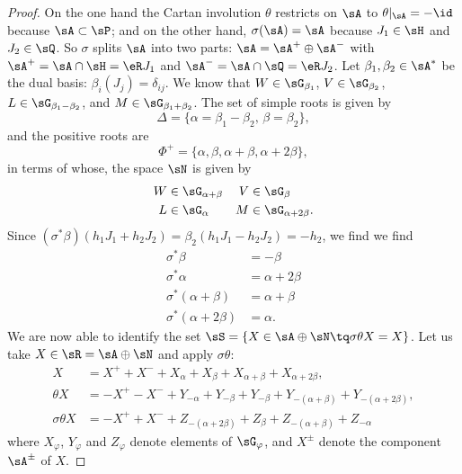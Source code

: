 \begin{proof}
On the one hand the Cartan involution $\theta$ restricts on $\sA$ to $\theta|_{\sA}=-\id$ because $\sA\subset\sP$; and on the other hand, $\sigma(\sA)=\sA$ because $J_1\in\sH$ and $J_2\in\sQ$. So $\sigma$ splits $\sA$ into two parts:  $\sA=\sA^{+}\oplus\sA^{-}$ with $\sA^+=\sA\cap\sH=\eR J_1$ and $\sA^-=\sA\cap\sQ=\eR J_2$. Let $\beta_{1},\beta_{2}\in\sA^*$ be the dual basis: $\beta_{i}(J_{j})=\delta_{ij}$.  We know that $W\in\sG_{\beta_{1}}$, $V\in\sG_{\beta_{2}}$, $L\in\sG_{\beta_{1}-\beta_{2}}$, and $M\in\sG_{\beta_{1}+\beta_{2}}$.  The set of simple roots is given by
\[
  \Delta=\{ \alpha=\beta_{1}-\beta_{2},\,\beta=\beta_{2} \},
\]
and the positive roots are
\[
 \Phi^{+}=\{ \alpha,\beta,\alpha+\beta,\alpha+2\beta \},
\]
in terms of whose, the space $\sN$ is given by
\begin{align*}
W&\in\sG_{\alpha+\beta}&V&\in\sG_{\beta}\\
L&\in\sG_{\alpha}&M&\in\sG_{\alpha+2\beta}.
\end{align*}
Since $(\sigma^*\beta)(h_1J_1+h_2J_2)=\beta_{2}(h_1J_1-h_2J_2)=-h_2$, we find
 we find
\begin{align*}
 \sigma^*\beta&=-\beta\\
\sigma^*\alpha&=\alpha+2\beta\\
\sigma^*(\alpha+\beta)&=\alpha+\beta\\
\sigma^*(\alpha+2\beta)&=\alpha.
\end{align*}
We are now able to identify the set $\sS=\{ X\in\sA\oplus\sN\tq \sigma\theta X=X \}$. Let us take $X\in\sR=\sA\oplus\sN$ and apply $\sigma\theta$:
\begin{equation}
\begin{split}
  X&=X^++X^-+X_{\alpha}+X_{\beta}+X_{\alpha+\beta}+X_{\alpha+2\beta},\\
\theta X&=-X^+-X^-+Y_{-\alpha}+Y_{-\beta}+Y_{-\beta}+Y_{-(\alpha+\beta)}+Y_{-(\alpha+2\beta)},\\
\sigma\theta X&=-X^++X^-+Z_{-(\alpha+2\beta)}+Z_{\beta}+Z_{-(\alpha+\beta)}+Z_{-\alpha}
\end{split}
\end{equation}
where $X_{\varphi}$, $Y_{\varphi}$ and $Z_{\varphi}$ denote elements of $\sG_{\varphi}$, and $X^{\pm}$ denote the component $\sA^{\pm}$ of $X$.


\end{proof}
